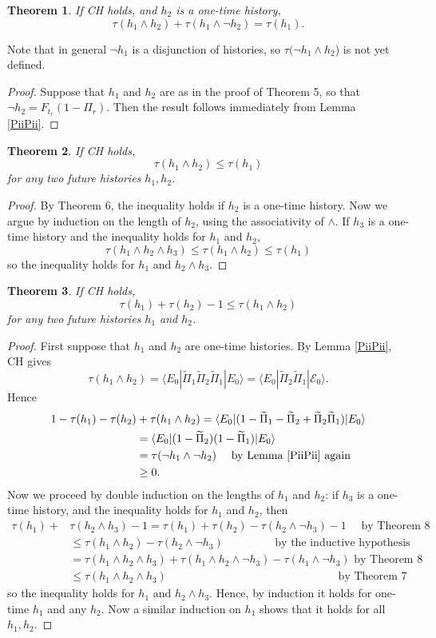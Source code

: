 \documentclass[12pt,reqno]{article}
\newcommand{\upline}{\vspace{-1.2\abovedisplayskip}}
\renewcommand{\(}{\left(}
\renewcommand{\)}{\right)}
\newcommand{\E}{\mathcal{E}}
\newcommand{\<}{\langle}
\renewcommand{\>}{\rangle}
\newcommand{\qqquad}{\quad\quad\quad}
\newcommand{\be}{\begin{equation}}
\newcommand{\ee}{\end{equation}}
\newcommand{\Pii}{\widetilde{\Pi}}
\theoremstyle{plain} %
\newtheorem{thm}{Theorem}
\begin{document}
\begin{thm}\label{hnoth} If CH holds, and $h_2$ is a one-time history,
\[
\tau(h_1\land h_2) + \tau(h_1\land\lnot h_2) = \tau (h_1).
\]
\end{thm}
Note that in general $\lnot h_1$ is a disjunction of histories, so $\tau(\lnot h_1\land h_2$) is not yet defined.
\begin{proof}
Suppose that $h_1$ and $h_2$ are as in the proof of Theorem 5, so that 
$\lnot h_2 = F_{t_r}(1 - \Pi_r)$. Then the result follows immediately from Lemma \ref{PiiPii}.
\end{proof}

\begin{thm} If CH holds,
\[
\tau(h_1\land h_2) \le \tau(h_1)
\]
for any two future histories $h_1, h_2$.
\end{thm}
\begin{proof}
By Theorem 6, the inequality holds if $h_2$ is a one-time history. Now we argue by induction on the length of $h_2$, using the associativity of $\land$. If $h_3$ is a one-time history and the inequality holds for $h_1$ and $h_2$,
\[
\tau(h_1\land h_2\land h_3) \le \tau(h_1\land h_2) \le \tau(h_1)
\]
so the inequality holds for $h_1$ and $h_2\land h_3$.
\end{proof} 

\begin{thm}\label{tauineq} If CH holds,
\[
\tau(h_1) + \tau(h_2) - 1 \le \tau(h_1\land h_2)
\]
for any two future histories $h_1$ and $h_2$.
\end{thm}
\begin{proof}
First suppose that $h_1$ and $h_2$ are one-time histories. By Lemma \ref{PiiPii}, CH gives
\be\label{twopi}
\tau(h_1\land h_2) = \<E_0|\Pii_1\Pii_2\Pii_1|E_0\> = \<E_0|\Pii_2\Pii_1|\E_0\>.
\ee
Hence\upline
\begin{align*}
1 - \tau(h_1) - \tau(h_2) &+ \tau(h_1\land h_2) = \<E_0|(1 - \Pii_1 - \Pii_2 + \Pii_2\Pii_1)|E_0\> \\
&= \<E_0|(1-\Pii_2)(1-\Pii_1)|E_0\>\\
&= \tau(\lnot h_1\land\lnot h_2) \quad\text{ by Lemma \ref{PiiPii} again}\\
&\ge 0.
\end{align*}
Now we proceed by double induction on the lengths of $h_1$ and $h_2$: if $h_3$ is a one-time history, and the inequality holds for $h_1$ and $h_2$, then
\begin{align*}
\tau(h_1) + {} &\tau(h_2\land h_3) - 1 = \tau(h_1) + \tau(h_2) - \tau(h_2\land \lnot h_3) - 1 \quad\text{ by Theorem 8}\\
&\le \tau(h_1\land h_2) - \tau(h_2\land\lnot h_3) \;\quad\quad\quad\quad \text{ by the inductive hypothesis}\\
&= \tau(h_1\land h_2\land h_3) + \tau(h_1\land h_2\land \lnot h_3) - \tau(h_1\land \lnot h_3) \text{ by Theorem 8}\\
&\le \tau(h_1\land h_2\land h_3) \qqquad\qqquad\qqquad\qqquad\qqquad\text{ by Theorem 7}
\end{align*}
so the inequality holds for $h_1$ and $h_2\land h_3$. Hence, by induction it holds for one-time $h_1$ and any $h_2$. Now a similar induction on $h_1$ shows that it holds for all $h_1,h_2$.
\end{proof} 
\end{document}
